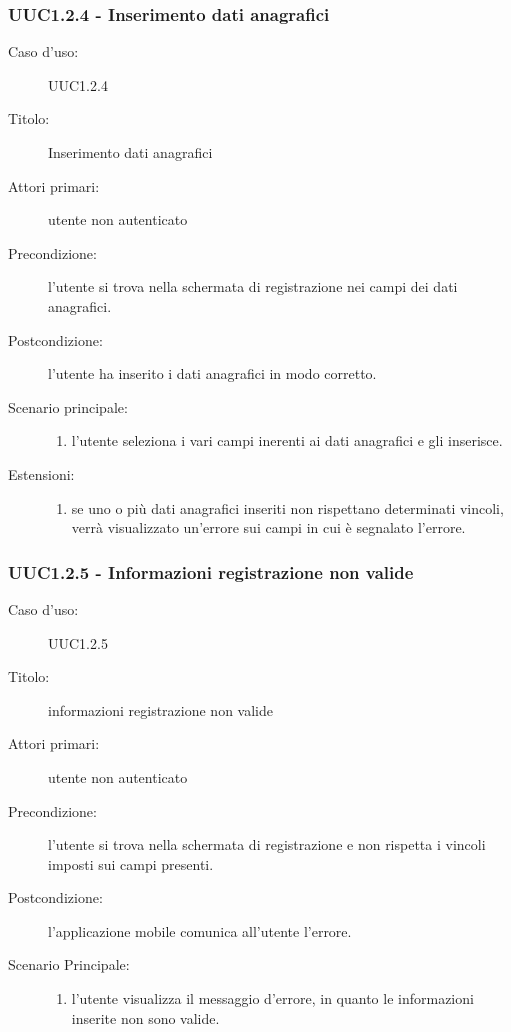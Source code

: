 \documentclass[casi-duso]{subfiles}
\begin{document}
\subsubsection{UUC1.2.4 - Inserimento dati anagrafici}%
\label{subsub:UUC1.2.4utente}
\begin{description}
  \item[Caso d’uso:] UUC1.2.4
  \item[Titolo:] Inserimento dati anagrafici
  \item[Attori primari:] utente non autenticato
  \item[Precondizione:] l'utente si trova nella schermata di registrazione nei campi dei dati anagrafici.
  \item[Postcondizione:] l'utente ha inserito i dati anagrafici in modo corretto.
  \item[Scenario principale:]
        \begin{enumerate}
          \item l'utente seleziona i vari campi inerenti ai dati anagrafici e gli inserisce.
        \end{enumerate}
  \item[Estensioni:]
        \begin{enumerate}
          \item se uno o più dati anagrafici inseriti non rispettano determinati vincoli, verrà visualizzato un'errore sui campi in cui è segnalato l'errore.
        \end{enumerate}
\end{description}

\subsubsection{UUC1.2.5 - Informazioni registrazione non valide}%
\label{subsub:UUC1.2.5utente}
\begin{description}
  \item[Caso d’uso:] UUC1.2.5
  \item[Titolo:] informazioni registrazione non valide
  \item[Attori primari:] utente non autenticato
  \item[Precondizione:] l'utente si trova nella schermata di registrazione e non rispetta i vincoli imposti sui campi presenti.
  \item[Postcondizione:] l'applicazione mobile comunica all'utente l'errore.
  \item[Scenario Principale:]
        \begin{enumerate}
          \item l'utente visualizza il messaggio d'errore, in quanto le informazioni inserite non sono valide.
        \end{enumerate}
\end{description}
\end{document}

